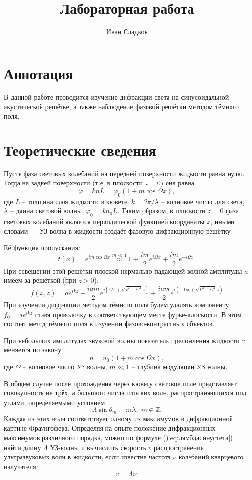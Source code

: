 \documentclass[a4paper]{article}
\title{Лабораторная работа \labnum \space \labname} %
\author{Иван Сладков}
\begin{document}
\maketitle
\thispagestyle{empty}
\section{Аннотация}
В данной работе проводится изучение дифракции света на синусоидальной акустической решётке, а также наблюдение фазовой решётки методом тёмного поля.


\section{Теоретические сведения}

Пусть фаза световых колебаний на передней поверхности жидкости равна нулю. Тогда на задней поверхности (т.е. в плоскости $ z=0 $) она равна \[\varphi = k n L = \varphi_0(1+m \cos \Omega x),\]
где $ L $ -- толщина слоя жидкости в кювете, $ k = 2 \pi /\lambda $ -- волновое число для света, $\lambda $ -- длина световой волны, $ \varphi_0 = k n_0 L $. Таким образом, в плоскости $ z=0 $ фаза световых колебаний является периодической функцией координаты $ x $, иными словами — УЗ-волна в жидкости создаёт фазовую дифракционную решётку.

Её функция пропускания:
\begin{equation}\label{eq:1}
	t(x) = e^{i m \cos \Omega x} \overset{m \ll 1}{\approx} 1 + \frac{im}{2}e^{i \Omega x} + \frac{im}{2}e^{-i \Omega x}.
\end{equation} 
При освещении этой решётки плоской нормально падающей волной амплитуды $ a $ имеем за решёткой (при $ z > 0 $):
\[f(x, z) = a e^{i k z} + \frac{i a m}{2} e^{i(\Omega x +\sqrt{k^2-\Omega^2 } z )}+\frac{i a m}{2} e^{i(-\Omega x +\sqrt{k^2-\Omega^2 } z )}\]
При изучении дифракции методом тёмного поля будем удалять компоненту $ f_0 = a e^{i k z} $ ставя проволочку в соответствующем месте фурье-плоскости. В этом состоит метод тёмного поля в изучении фазово-контрастных объектов. 

При небольших амплитудах звуковой волны показатель преломления жидкости n меняется по закону
\[n=n_0(1+m \cos \Omega x),\]
где $ \Omega $ -- волновое число УЗ волны, $ m\ll 1 $ -- глубина модуляции УЗ волны.

В общем случае после прохождения через кювету световое поле представляет совокупность не трёх, а большого числа плоских волн, распространяющихся под углами, определяемыми условием \begin{equation}\label{eq:лямбдасинустета}
	\Lambda \sin \theta_m = m \lambda, \; m\in \mathbb{Z}.
\end{equation}
Каждая из этих волн соответствует одному из максимумов в дифракционной картине Фраунгофера.
Определяя на опыте положение дифракционных максимумов различного порядка, можно по формуле ()\ref{eq:лямбдасинустета}) найти длину $ \Lambda $ УЗ-волны и вычислить скорость $ v $ распространения ультразвуковых волн в жидкости, если известна частота $ \nu $ колебаний кварцевого излучателя:
\[v = \Lambda \nu .\] 
\end{document}
